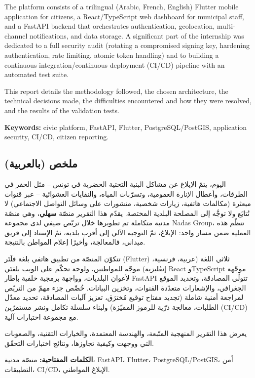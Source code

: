 \documentclass[12pt, a4paper]{report}
\begin{document}
The platform consists of a trilingual (Arabic, French, English) Flutter mobile application for citizens, a React/TypeScript web dashboard for municipal staff, and a FastAPI backend that orchestrates authentication, geolocation, multi-channel notifications, and data storage. A significant part of the internship was dedicated to a full security audit (rotating a compromised signing key, hardening authentication, rate limiting, atomic token handling) and to building a continuous integration/continuous deployment (CI/CD) pipeline with an automated test suite.

This report details the methodology followed, the chosen architecture, the technical decisions made, the difficulties encountered and how they were resolved, and the results of the validation tests.

\textbf{Keywords:} civic platform, FastAPI, Flutter, PostgreSQL/PostGIS, application security, CI/CD, citizen reporting.

\bigskip

\begin{arabic}
\section*{ملخص (بالعربية)}
اليوم، يتمّ الإبلاغ عن مشاكل البنية التحتية الحضرية في تونس -- مثل الحفر في الطرقات، وأعطال الإنارة العمومية، وتسرّبات المياه، والنفايات العشوائية -- عبر قنوات مبعثرة (مكالمات هاتفية، زيارات شخصية، منشورات على وسائل التواصل الاجتماعي) لا تُتابَع ولا توجَّه إلى المصلحة البلدية المختصة. يقدّم هذا التقرير منصّة \textbf{سهلي}، وهي منصّة مدنية متكاملة تم تطويرها خلال تربّص صيفي لدى مجموعة Nadas Group، تنظّم هذه العملية ضمن مسار واحد: الإبلاغ، ثمّ التوجيه الآلي إلى أقرب بلدية، ثمّ الإسناد إلى فريق ميداني، فالمعالجة، وأخيرًا إعلام المواطن بالنتيجة.

تتكوّن المنصّة من تطبيق هاتفي بلغة فلَتَر (Flutter) ثلاثي اللغة (عربية، فرنسية، إنڤليزية) موجّه للمواطنين، ولوحة تحكّم على الويب بلغتَي React وTypeScript موجّهة لأعوان البلديات، وواجهة برمجية خلفية بإطار FastAPI تتولّى المصادقة، وتحديد الموقع الجغرافي، والإشعارات متعدّدة القنوات، وتخزين البيانات. خُصِّص جزء مهمّ من التربّص لمراجعة أمنية شاملة (تجديد مفتاح توقيع مُخترَق، تعزيز آليات المصادقة، تحديد معدّل الطلبات، معالجة ذرّية للرموز المميّزة) ولبناء سلسلة تكامل ونشر مستمرّين (CI/CD) مع مجموعة اختبارات آلية.

يعرض هذا التقرير المنهجية المتّبعة، والهندسة المعتمدة، والخيارات التقنية، والصعوبات التي ووجهت وكيفية تجاوزها، ونتائج اختبارات التحقّق.

\textbf{الكلمات المفتاحية:} منصّة مدنية، FastAPI، Flutter، PostgreSQL/PostGIS، أمن التطبيقات، CI/CD، الإبلاغ المواطني.
\end{arabic}
\end{document}
